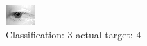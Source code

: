 \begin{figure}[h!]
\begin{center}
\includegraphics[width=0.60\columnwidth]{figures/ID2660_class_3_target_4.png}
\end{center}
\caption{ Classification: 3 actual target: 4}
\label{fig:ID2660_class_3_target_4}
\end{figure}
